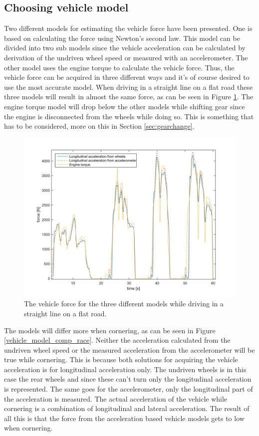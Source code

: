 \subsection{Choosing vehicle model}
Two different models for estimating the vehicle force have been presented. One is based on calculating the force using Newton's second law. This model can be divided into two sub models since the vehicle acceleration can be calculated by derivation of the undriven wheel speed or measured with an accelerometer. The other model uses the engine torque to calculate the vehicle force. Thus, the vehicle force can be acquired in three different ways and it's of course desired to use the most accurate model. When driving in a straight line on a flat road these three models will result in almost the same force, as can be seen in Figure \ref{vehicle_model_comp_olikaacc}. The engine torque model will drop below the other models while shifting gear since the engine is disconnected from the wheels while doing so. This is something that has to be considered, more on this in Section \ref{sec:gearchange}.

\begin{figure}[h]
	\centering
	\includegraphics[width=1\textwidth]{Pictures/vehicle_model_comp_olikaacc}
	\caption{The vehicle force for the three different models while driving in a straight line on a flat road.}
	\label{vehicle_model_comp_olikaacc}
\end{figure}

The models will differ more when cornering, as can be seen in Figure \ref{vehicle_model_comp_race}. Neither the acceleration calculated from the undriven wheel speed or the measured acceleration from the accelerometer will be true while cornering. This is because both solutions for acquiring the vehicle acceleration is for longitudinal acceleration only. The undriven wheels is in this case the rear wheels and since these can't turn only the longitudinal acceleration is represented. The same goes for the accelerometer, only the longitudinal part of the acceleration is measured. The actual acceleration of the vehicle while cornering is a combination of longitudinal and lateral acceleration. The result of all this is that the force from the acceleration based vehicle models gets to low when cornering. 

